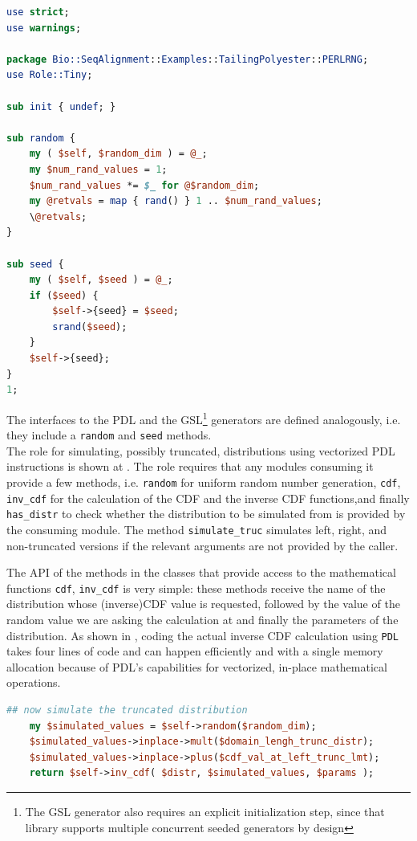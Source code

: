 \documentclass[10pt]{article}
\begin{document}
\begin{lstlisting}[language=Perl,basicstyle=\footnotesize,frame=single,caption={A simple OO API for random number generation.},label={lst:OORNG},captionpos=b]
use strict;
use warnings;

package Bio::SeqAlignment::Examples::TailingPolyester::PERLRNG;
use Role::Tiny;

sub init { undef; }

sub random {
    my ( $self, $random_dim ) = @_;
    my $num_rand_values = 1;
    $num_rand_values *= $_ for @$random_dim;
    my @retvals = map { rand() } 1 .. $num_rand_values;
    \@retvals;
}

sub seed {
    my ( $self, $seed ) = @_;
    if ($seed) {
        $self->{seed} = $seed;
        srand($seed);
    }
    $self->{seed};
}
1;
\end{lstlisting}
The interfaces to the PDL and the GSL\footnote{The GSL generator also requires an explicit initialization step, since that library supports multiple concurrent seeded generators by design} generators are defined analogously, i.e. they include a \texttt{random} and \texttt{seed} methods.
\\
The role for simulating, possibly truncated, distributions using vectorized PDL instructions is shown at . The role requires that any modules consuming it provide a few methods, i.e.  \texttt{random} for uniform random number generation,  \texttt{cdf}, \texttt{inv\_cdf} for the calculation of the CDF and the inverse CDF functions,and finally  \texttt{has\_distr} to check whether the distribution to be simulated from is provided  by the consuming module. The method \texttt{simulate\_truc} simulates left, right, and non-truncated versions if the relevant arguments are not provided by the caller. 


The API of the methods in the classes that provide access to the mathematical functions \texttt{cdf}, \texttt{inv\_cdf}  is very simple: these methods receive the name of the distribution whose (inverse)CDF value is requested, followed by the value of the random value we are asking the calculation at and finally the parameters of the distribution. 
As shown in , coding the actual inverse CDF calculation using \texttt{PDL} takes four lines of code and can happen efficiently and with a single memory allocation because of PDL's capabilities for vectorized, in-place mathematical operations.
\begin{lstlisting}[language=Perl,basicstyle=\footnotesize,frame=none,caption={The inverse CDF calculations in  PDL.},label={lst:InvCDFWithPDL},captionpos=b]
    ## now simulate the truncated distribution
    my $simulated_values = $self->random($random_dim);
    $simulated_values->inplace->mult($domain_lengh_trunc_distr);
    $simulated_values->inplace->plus($cdf_val_at_left_trunc_lmt);
    return $self->inv_cdf( $distr, $simulated_values, $params );
\end{lstlisting}
\end{document}
